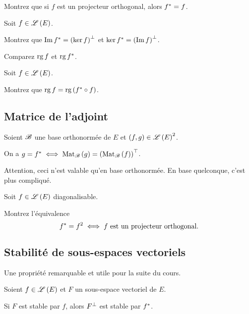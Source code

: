 \begin{exo}
Montrez que si \(f\) est un projecteur orthogonal, alors \(f^*=f\).
\end{exo}

\begin{exo}
Soit \(f\in\mathscr{L}\left(E\right)\).

Montrez que \(\operatorname{Im} f^*=\left(\ker f\right)^{\perp}\) et \(\ker f^*=\left(\operatorname{Im} f\right)^{\perp}\).

Comparez \(\operatorname{rg} f\) et \(\operatorname{rg} f^*\).
\end{exo}

\begin{exo}
Soit \(f\in\mathscr{L}\left(E\right)\).

Montrez que \(\operatorname{rg} f=\operatorname{rg}\left(f^*\circ f\right)\).
\end{exo}

\subsection{Matrice de l'adjoint}

\begin{prop}
Soient \(\mathscr{B}\) une base orthonormée de \(E\) et \(\left(f,g\right)\in\mathscr{L}\left(E\right)^2\).

On a \(g=f\adj\ssi\Mat{g}=\trans{\paren{\Mat{f}}}\).
\end{prop}

\begin{rem}
Attention, ceci n'est valable qu'en base orthonormée. En base quelconque, c'est plus compliqué.
\end{rem}

\begin{exo}
Soit \(f\in\mathscr{L}\left(E\right)\) diagonalisable.

Montrez l'équivalence \[f^*=f^2\iff f\text{ est un projecteur orthogonal}.\]
\end{exo}

\subsection{Stabilité de sous-espaces vectoriels}

Une propriété remarquable et utile pour la suite du cours.

\begin{prop}
Soient \(f\in\mathscr{L}\left(E\right)\) et \(F\) un sous-espace vectoriel de \(E\).

Si \(F\) est stable par \(f\), alors \(F^{\perp}\) est stable par \(f^*\).
\end{prop}


